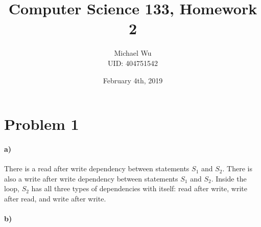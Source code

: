 \documentclass[12pt]{article}
\begin{document}
\title{Computer Science 133, Homework 2}
\date{February 4th, 2019}
\author{Michael Wu\\UID: 404751542}
\maketitle

\section*{Problem 1}

\paragraph{a)}

There is a read after write dependency between statements \(S_1\) and \(S_2\). There is also
a write after write dependency between statements \(S_1\) and \(S_2\). Inside the loop,
\(S_2\) has all three types of dependencies with itself: read after write, write after
read, and write after write.

\paragraph{b)}
\end{document}
